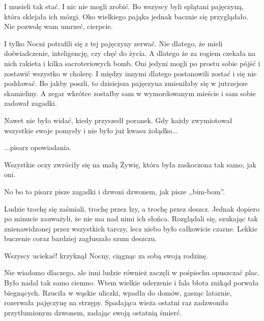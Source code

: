 I musieli tak stać.
I nic nie mogli zrobić.
Bo wszyscy byli splątani pajęczyną, która sklejała ich mózgi.
Oko wielkiego pająka jednak bacznie się przyglądało.
Nie pozwolę wam umrzeć, cierpcie.

I tylko Nocni potrafili się z tej pajęczyny zerwać.
Nie dlatego, że mieli doświadczenie, inteligencję, czy chęć do życia.
A dlatego że za rogiem czekała na nich rakieta i kilka sacroteriowych bomb.
Oni jedyni mogli po prostu sobie pójść i zostawić wszystko w cholerę.
I między innymi dlatego postanowili zostać i się nie poddawać.
Bo jakby poszli, to dzisiejsza pajęczyna zmieniłaby się w jutrzejsze skamieliny.
A zegar wkrótce zostałby sam w wymordowanym mieście i sam sobie zadawał zagadki.

Nawet nie było widać, kiedy przyszedł poranek.
Gdy każdy zwymiotował wszystkie swoje pomysły i nie było już kwasu żołądko...
\begin{dialogue}
	\ds{} ...pisarz opowiadania.
\end{dialogue}
Wszystkie oczy zwróciły się na małą Żywię, która była zaskoczona tak samo, jak oni.
\begin{dialogue}
	\ds{} No bo to pisarz pisze zagadki i dzwoni dzwonem, jak pisze ,,bim-bom''.
\end{dialogue}
Ludzie trochę się zaśmiali, trochę przez łzy, a trochę przez deszcz.
Jednak dopiero po minucie zauważyli, że nie ma nad nimi ich słońca.
Rozglądali się, szukając tak znienawidzonej przez wszystkich tarczy, lecz niebo było całkowicie czarne.
Lekkie buczenie coraz bardziej zagłuszało szum deszczu.
\begin{dialogue}
	\ds{} Wszyscy uciekać! \dm{} krzyknął Nocny, ciągnąc za sobą swoją rodzinę.
\end{dialogue}
Nie wiadomo dlaczego, ale inni ludzie również zaczęli w pośpiechu opuszczać plac.
Było nadal tak samo ciemno.
Wtem wielkie uderzenie i fala błota znikąd porwała biegnących.
Rzuciła w wąskie uliczki, wpadła do domów, gasząc latarnie, rozerwała pajęczynę na strzępy.
Spadająca wieża ostatni raz zadzwoniła przytłumionym dzwonem, zadając swoją ostatnią śmierć.


















